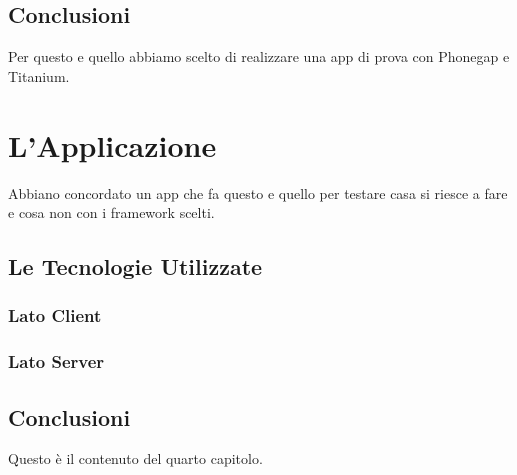 	\section{Conclusioni}
		Per questo e quello abbiamo scelto di realizzare una app di prova con
		Phonegap e Titanium.


\chapter{L'Applicazione}
	Abbiano concordato un app che fa questo e quello per testare casa si riesce a
	fare e cosa non con i framework scelti.
	\section{Le Tecnologie Utilizzate}
		\subsection{Lato Client}
		\subsection{Lato Server}
	
	\section{Conclusioni}
	Questo è il contenuto del quarto capitolo.
